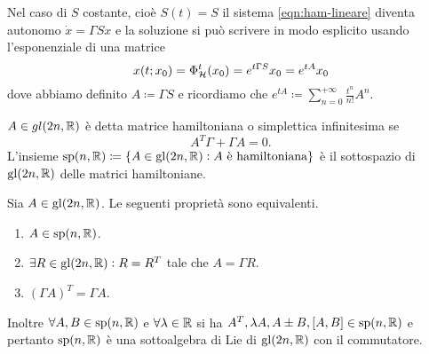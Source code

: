 Nel caso di $ S $ costante, cioè $ S(t) = S $ il sistema \eqref{eqn:ham-lineare} diventa autonomo $ \dot{x} = \Gamma S x $ e la soluzione si può scrivere in modo esplicito usando l'esponenziale di una matrice
\begin{equation}
    x(t; x_0) = \Phi^t_{\mathcal{H}}(x_0) = e^{t \Gamma S} x_0 = e^{tA} x_0
\end{equation}
dove abbiamo definito $ A \coloneqq \Gamma S $ e ricordiamo che $ e^{tA} \coloneqq \sum_{n=0}^{+\infty} \frac{t^n}{n!}A^n $.

\begin{definition}
    $ A \in gl(2n, \mathbb{R}) $ è detta matrice hamiltoniana o simplettica infinitesima se
    \begin{equation}
        A^T \Gamma + \Gamma A = 0.
    \end{equation}
    L'insieme $ \mathrm{sp}(n, \mathbb{R}) \coloneqq \{A \in \mathrm{gl}(2n, \mathbb{R}) : A \text{ è hamiltoniana}\} $ è il sottospazio di $ \mathrm{gl}(2n, \mathbb{R}) $ delle matrici hamiltoniane.
\end{definition}

\begin{thm}
    Sia $ A \in \mathrm{gl}(2n, \mathbb{R}) $. Le seguenti proprietà sono equivalenti.
    \begin{enumerate}[label=(\roman*)]
        \item $ A \in \mathrm{sp}(n, \mathbb{R}) $.
        \item $ \exists R \in \mathrm{gl}(2n, \mathbb{R}) : R = R^T $ tale che $ A = \Gamma R $.
        \item $ (\Gamma A)^T = \Gamma A $.
    \end{enumerate}
    Inoltre $ \forall A, B \in \mathrm{sp}(n, \mathbb{R}) $ e $ \forall \lambda \in \mathbb{R} $ si ha $ A^T, \lambda A, A \pm B, [A, B] \in \mathrm{sp}(n, \mathbb{R}) $ e pertanto $ \mathrm{sp}(n, \mathbb{R}) $ è una sottoalgebra di Lie di $ \mathrm{gl}(2n, \mathbb{R}) $ con il commutatore.
\end{thm}
